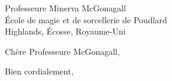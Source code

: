 \documentclass[10pt,language=french]{ETSletter}  %
\begin{document}
\begin{letter}{
    Professeure Minerva McGonagall\\ 
    École de magie et de sorcellerie de Poudlard\\ 
    Highlands, Écosse, Royaume-Uni\\ 
}
 
\opening{Chère Professeure McGonagall,}

\lipsum[1-3]

\closing{Bien cordialement,}

\end{letter}
\end{document}
